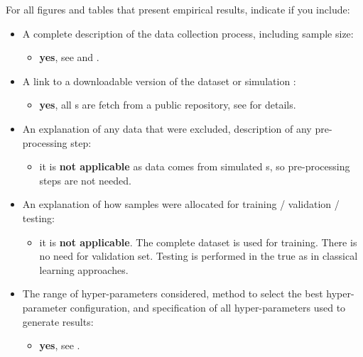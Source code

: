 For all figures and tables that present empirical results, indicate if you include:

\begin{itemize}
    \item A complete description of the data collection process, including sample size:

    \begin{itemize}
        \item\textbf{yes}, see  and .
    \end{itemize}
    \item A link to a downloadable version of the dataset or simulation :

    \begin{itemize}
        \item  \textbf{yes}, all s are fetch from a public repository, see  for details.
    \end{itemize}
    \item An explanation of any data that were excluded, description of any pre-processing step:
    \begin{itemize}
        \item it is \textbf{not applicable} as data comes from simulated s, so pre-processing steps are not needed.
    \end{itemize}

    \item An explanation of how samples were allocated for training / validation / testing:
    \begin{itemize}
        \item it is \textbf{not applicable}. The complete dataset is used for training. There is no need for validation set. Testing is performed in the true  as in classical  learning approaches.
    \end{itemize}

    \item The range of hyper-parameters considered, method to select the best hyper-parameter configuration, and specification of all hyper-parameters used to generate results:

    \begin{itemize}
        \item \textbf{yes}, see .
    \end{itemize}


\end{itemize}
